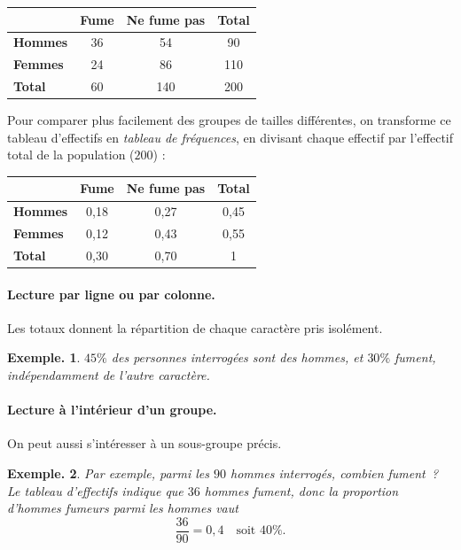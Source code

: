 \documentclass[12pt]{article}
\theoremstyle{break}
\newtheorem*{example}{Exemple.}
\begin{document}
\begin{center}
\begin{tabular}{|l|c|c|c|}
\hline
 & \textbf{Fume} & \textbf{Ne fume pas} & \textbf{Total} \\
\hline
\textbf{Hommes} & 36 & 54 & 90 \\
\hline
\textbf{Femmes} & 24 & 86 & 110 \\
\hline
\textbf{Total} & 60 & 140 & 200 \\
\hline
\end{tabular}
\end{center}
 
Pour comparer plus facilement des groupes de tailles différentes, on transforme ce tableau d'effectifs en \emph{tableau de fréquences}, en divisant chaque effectif par l'effectif total de la population ($200$) :
 
\begin{center}
\begin{tabular}{|l|c|c|c|}
\hline
 & \textbf{Fume} & \textbf{Ne fume pas} & \textbf{Total} \\
\hline
\textbf{Hommes} & 0,18 & 0,27 & 0,45 \\
\hline
\textbf{Femmes} & 0,12 & 0,43 & 0,55 \\
\hline
\textbf{Total} & 0,30 & 0,70 & 1 \\
\hline
\end{tabular}
\end{center}

\paragraph{Lecture par ligne ou par colonne.} Les totaux donnent la répartition de chaque caractère pris isolément.

\begin{example}
   $45\%$ des personnes interrogées sont des hommes, et $30\%$ fument, indépendamment de l'autre caractère.
\end{example}
 
\paragraph{Lecture à l'intérieur d'un groupe.} On peut aussi s'intéresser à un sous-groupe précis.
\begin{example}
Par exemple, parmi les $90$ hommes interrogés, combien fument~? Le tableau d'effectifs indique que $36$ hommes fument, donc la proportion d'hommes fumeurs \emph{parmi les hommes} vaut
\[
\frac{36}{90} = 0{,}4 \quad \text{soit } 40\%.
\]
\end{example}
\end{document}
